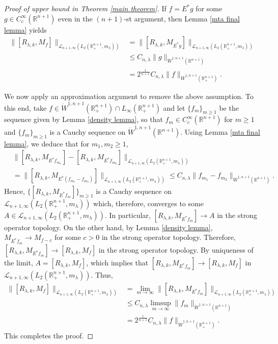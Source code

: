 \documentclass[12pt]{amsart}
\begin{document}
\begin{proof}[Proof of upper bound in Theorem \ref{main theorem}] {\color{blue}If $f=E^{\ast}g$ for some $g\in C_c^\infty(\mathbb{R}^{n+1})$ even in the $(n+1)$-st argument, then Lemma \ref{mta final lemma} yields
\begin{align*}
\|[R_{\lambda,k},M_f]\|_{\mathcal{L}_{n+1,\infty}(L_2(\mathbb{R}^{n+1}_+,m_{\lambda}))}&=\|[R_{\lambda,k},M_{E^{\ast}g}]\|_{\mathcal{L}_{n+1,\infty}(L_2(\mathbb{R}^{n+1}_+,m_{\lambda}))}\\
&\leq C_{n,\lambda}\|g\|_{\dot{W}^{1,n+1}(\mathbb{R}^{n+1})}\\
&=2^{\frac1{n+1}}C_{n,\lambda}\|f\|_{\dot{W}^{1,n+1}(\mathbb{R}^{n+1}_+)}.
\end{align*}
}

We now apply an approximation argument to remove the above assumption. To this end, take $f\in  \dot{W}^{1,n+1}(\mathbb{R}_+^{n+1})\cap L_{\infty}(\mathbb{R}_+^{n+1})$ and let $\{f_m\}_{m\geq 1}$ be the sequence given by Lemma \ref{density lemma}, so that $f_m\in C_c^\infty(\mathbb{R}^{n+1})$ for $m\geq 1$ and $\{f_m\}_{m\geq 1}$ is a Cauchy sequence on $\dot{W}^{1,n+1}(\mathbb{R}^{n+1})$. Using Lemma \ref{mta final lemma}, we deduce that for $m_1,m_2\geq1$,
\begin{align*}
&\|[R_{\lambda,k},M_{E^{\ast}f_{m_1}}]-[R_{\lambda,k},M_{E^{\ast}f_{m_2}}]\|_{\mathcal{L}_{n+1,\infty}(L_2(\mathbb{R}^{n+1}_+,m_{\lambda}))}\\
&=\|[R_{\lambda,k},M_{E^{\ast}(f_{m_1}-f_{m_2})}]\|_{\mathcal{L}_{n+1,\infty}(L_2(\mathbb{R}^{n+1}_+,m_{\lambda}))}\leq C_{n,\lambda}\|f_{m_1}-f_{m_2}\|_{\dot{W}^{1,n+1}(\mathbb{R}^{n+1})}.
\end{align*}
Hence, $\{[R_{\lambda,k},M_{E^{\ast}f_{m}}]\}_{m\geq 1}$ is a Cauchy sequence on $\mathcal{L}_{n+1,\infty}(L_2(\mathbb{R}^{n+1}_+,m_{\lambda}))$ which, therefore, converges to some $A\in \mathcal{L}_{n+1,\infty}(L_2(\mathbb{R}^{n+1}_+,m_{\lambda})).$ In particular, $[R_{\lambda,k},M_{E^{\ast}f_{m}}]\rightarrow A$
in the strong operator topology. On the other hand, by Lemma \ref{density lemma}, $M_{E^{\ast}f_m}\rightarrow M_{f-c}$ for some $c>0$ in the strong operator topology. Therefore, $[R_{\lambda,k},M_{E^{\ast}f_m}]\rightarrow [R_{\lambda,k},M_f]$
in the strong operator topology. By uniqueness of the limit, $A=[R_{\lambda,k},M_f]$, which implies that  $[R_{\lambda,k},M_{E^{\ast}f_m}]\rightarrow [R_{\lambda,k},M_f]$
in $\mathcal{L}_{n+1,\infty}(L_2(\mathbb{R}^{n+1}_+,m_{\lambda})).$ Thus,
\begin{align*}
\|[R_{\lambda,k},M_f]\|_{\mathcal{L}_{n+1,\infty}(L_2(\mathbb{R}^{n+1}_+,m_{\lambda}))}&=\lim_{m\rightarrow \infty}\|[R_{\lambda,k},M_{E^{\ast}f_m}]\|_{\mathcal{L}_{n+1,\infty}(L_2(\mathbb{R}^{n+1}_+,m_{\lambda}))}\\
&\leq C_{n,\lambda}\limsup_{m\rightarrow \infty}\|f_m\|_{\dot{W}^{1,n+1}(\mathbb{R}^{n+1})}\\
&=2^{\frac1{n+1}}C_{n,\lambda}\|f\|_{\dot{W}^{1,n+1}(\mathbb{R}_+^{n+1})}.
\end{align*}
This completes the proof.
\end{proof}
\end{document}
